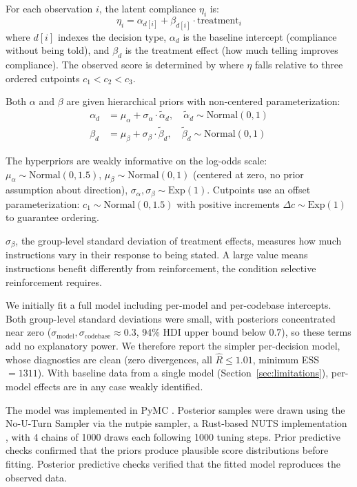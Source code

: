 \documentclass[a4paper]{llncs}
\begin{document}
For each observation $i$, the latent compliance $\eta_i$ is:
\begin{equation}
  \eta_i = \alpha_{d[i]} + \beta_{d[i]} \cdot \text{treatment}_i
\end{equation}
where $d[i]$ indexes the decision type, $\alpha_d$ is the baseline
intercept (compliance without being told), and $\beta_d$ is the
treatment effect (how much telling improves compliance). The observed
score is determined by where $\eta$ falls relative to three ordered
cutpoints $c_1 < c_2 < c_3$.

Both $\alpha$ and $\beta$ are given hierarchical priors with
non-centered parameterization:
\begin{align}
  \alpha_d &= \mu_\alpha + \sigma_\alpha \cdot \tilde{\alpha}_d, \quad
    \tilde{\alpha}_d \sim \text{Normal}(0, 1) \\
  \beta_d &= \mu_\beta + \sigma_\beta \cdot \tilde{\beta}_d, \quad
    \tilde{\beta}_d \sim \text{Normal}(0, 1)
\end{align}

The hyperpriors are weakly informative on the log-odds scale:
$\mu_\alpha \sim \text{Normal}(0, 1.5)$,
$\mu_\beta \sim \text{Normal}(0, 1)$ (centered at zero, no prior
assumption about direction),
$\sigma_\alpha, \sigma_\beta \sim \text{Exp}(1)$.
Cutpoints use an offset parameterization:
$c_1 \sim \text{Normal}(0, 1.5)$ with positive increments
$\Delta c \sim \text{Exp}(1)$ to guarantee ordering.

$\sigma_\beta$, the group-level standard deviation of treatment effects,
measures how much instructions vary in their response to being stated.
A large value means instructions benefit differently from
reinforcement, the condition selective reinforcement requires.

We initially fit a full model including per-model and per-codebase
intercepts. Both group-level standard deviations were small, with
posteriors concentrated near zero ($\sigma_\text{model},
\sigma_\text{codebase} \approx 0.3$, 94\% HDI upper bound below $0.7$), so
these terms add no explanatory power. We therefore report the simpler
per-decision model, whose diagnostics are clean (zero divergences, all
$\hat{R} \leq 1.01$, minimum ESS $= 1311$). With baseline data from a
single model (Section~\ref{sec:limitations}), per-model effects are in
any case weakly identified.

The model was implemented in PyMC \parencite{pymc2023}. Posterior
samples were drawn using the No-U-Turn Sampler
\parencite[NUTS;][]{hoffman2014} via the nutpie sampler, a Rust-based
NUTS implementation \parencite{nutpie2024}, with 4 chains of 1000
draws each following 1000 tuning steps. Prior predictive checks confirmed that the priors
produce plausible score distributions before fitting. Posterior
predictive checks verified that the fitted model reproduces the observed
data.
\end{document}
